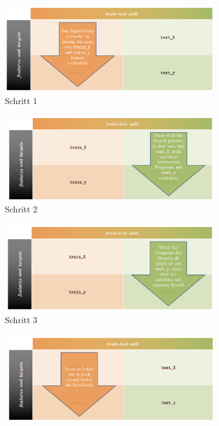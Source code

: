 \begin{lpu}
\begin{figure}[h!]
\centering
\begin{subfigure}[t]{0.45\textwidth}
  \includegraphics[width=\linewidth, valign=t]{testtrain_1.png}
  \caption{Schritt 1}
\end{subfigure}
\hfill
\begin{subfigure}[t]{0.45\textwidth}
  \includegraphics[width=\linewidth, valign=t]{testtrain_2.png}
  \caption{Schritt 2}
\end{subfigure}
\vspace{1em}
\begin{subfigure}[t]{0.45\textwidth}
  \includegraphics[width=\linewidth, valign=t]{testtrain_3.png}
  \caption{Schritt 3}
\end{subfigure}
\hfill
\begin{subfigure}[t]{0.45\textwidth}
  \includegraphics[width=\linewidth, valign=t]{testtrain_4.png}

\end{subfigure}
\end{figure}
\end{lpu}
